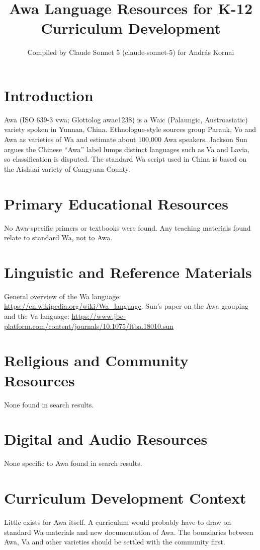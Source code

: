 \documentclass[12pt]{article}
\title{Awa Language Resources for K-12 Curriculum Development}
\author{Compiled by Claude Sonnet 5 (claude-sonnet-5) for Andr\'as Kornai}
\date{}
\begin{document}
\maketitle
\section{Introduction}
Awa (ISO 639-3 vwa; Glottolog awac1238) is a Waic (Palaungic, Austroasiatic) variety spoken in Yunnan, China. Ethnologue-style sources group Parauk, Vo and Awa as varieties of Wa and estimate about 100,000 Awa speakers. Jackson Sun argues the Chinese ``Awa'' label lumps distinct languages such as Va and Lavia, so classification is disputed. The standard Wa script used in China is based on the Aishuai variety of Cangyuan County.
\section{Primary Educational Resources}
No Awa-specific primers or textbooks were found. Any teaching materials found relate to standard Wa, not to Awa.
\section{Linguistic and Reference Materials}
General overview of the Wa language: \url{https://en.wikipedia.org/wiki/Wa_language}. Sun's paper on the Awa grouping and the Va language: \url{https://www.jbe-platform.com/content/journals/10.1075/ltba.18010.sun}
\section{Religious and Community Resources}
None found in search results.
\section{Digital and Audio Resources}
None specific to Awa found in search results.
\section{Curriculum Development Context}
Little exists for Awa itself. A curriculum would probably have to draw on standard Wa materials and new documentation of Awa. The boundaries between Awa, Va and other varieties should be settled with the community first.
\end{document}
